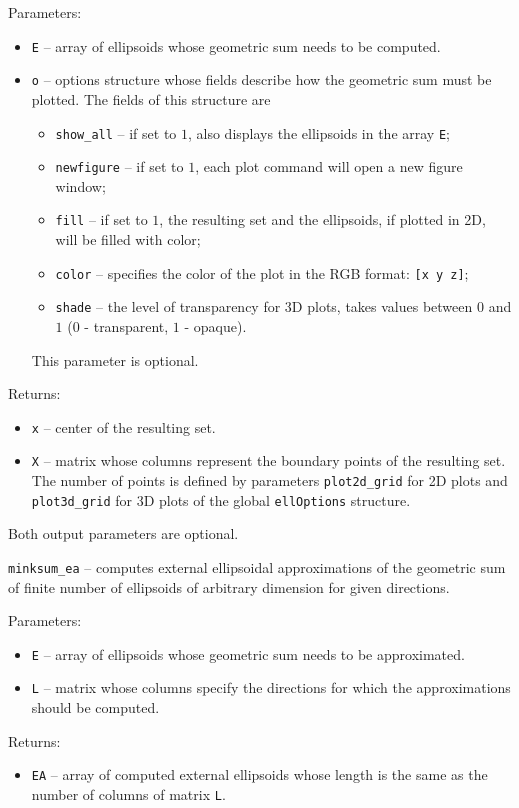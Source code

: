 Parameters:
\begin{itemize}
\item {\tt E} -- array of ellipsoids whose geometric sum needs to be computed.
\item {\tt o} -- options structure whose fields describe how the geometric
sum must be plotted. The fields of this structure are
\begin{itemize}
\item {\tt show\_all} -- if set to $1$, also displays the ellipsoids in the
array {\tt E};
\item {\tt newfigure} -- if set to $1$, each plot command will open a new
figure window;
\item {\tt fill} -- if set to $1$, the resulting set and the ellipsoids,
if plotted in 2D, will be filled with color;
\item {\tt color} -- specifies the color of the plot in the RGB format:
{\tt [x y z]};
\item {\tt shade} -- the level of transparency for 3D plots, takes values
between $0$ and $1$ ($0$ - transparent, $1$ - opaque).
\end{itemize}
This parameter is optional.
\end{itemize}

Returns:
\begin{itemize}
\item {\tt x} -- center of the resulting set.
\item {\tt X} -- matrix whose columns represent the boundary points of the
resulting set. The number of points is defined by parameters
{\tt plot2d\_grid} for 2D plots and {\tt plot3d\_grid} for 3D plots of the
global {\tt ellOptions} structure.
\end{itemize}
Both output parameters are optional.

\newpage

{\Large {\tt minksum\_ea}} -- computes external ellipsoidal approximations
of the geometric sum of finite number of ellipsoids of arbitrary dimension
for given directions.

Parameters:
\begin{itemize}
\item {\tt E} -- array of ellipsoids whose geometric sum needs to be
approximated.
\item {\tt L} -- matrix whose columns specify the directions for which
the approximations should be computed.
\end{itemize}

Returns:
\begin{itemize}
\item {\tt EA} -- array of computed external ellipsoids whose length is the same
as the number of columns of matrix {\tt L}.
\end{itemize}

